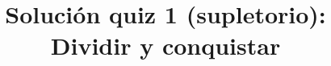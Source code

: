 \documentclass{doc}
\title{Solución quiz 1 (supletorio): Dividir y conquistar}
\begin{document}
\makedocheader
\soluciontrue

\end{document}
